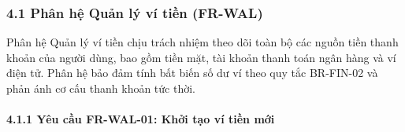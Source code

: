 \documentclass[11pt,a4paper]{article}
\begin{document}
\subsubsection{4.1 Phân hệ Quản lý ví tiền
(FR-WAL)}\label{41-phuxe2n-hux1ec7-quux1ea3n-luxfd-vuxed-tiux1ec1n-fr-wal}

Phân hệ Quản lý ví tiền chịu trách nhiệm theo dõi toàn bộ các nguồn tiền
thanh khoản của người dùng, bao gồm tiền mặt, tài khoản thanh toán ngân
hàng và ví điện tử. Phân hệ bảo đảm tính bất biến số dư ví theo quy tắc
BR-FIN-02 và phản ánh cơ cấu thanh khoản tức thời.

\paragraph{4.1.1 Yêu cầu FR-WAL-01: Khởi tạo ví tiền
mới}\label{411-yuxeau-cux1ea7u-fr-wal-01-khux1edfi-tux1ea1o-vuxed-tiux1ec1n-mux1edbi}
\end{document}
